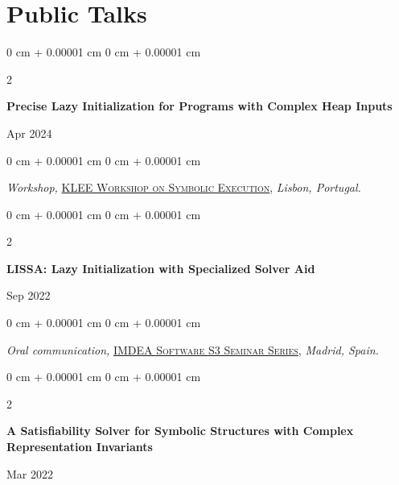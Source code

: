 \documentclass[10pt, letterpaper]{article}
\newenvironment{onecolentry}{
    \begin{adjustwidth}{
        0 cm + 0.00001 cm
    }{
        0 cm + 0.00001 cm
    }
}{
    \end{adjustwidth}
} %
\newenvironment{twocolentry}[2][]{
    \onecolentry
    \def\secondColumn{#2}
    \setcolumnwidth{\fill, 4.5 cm}
    \begin{paracol}{2}
}{
    \switchcolumn \raggedleft \secondColumn
    \end{paracol}
    \endonecolentry
} %
\begin{document}

\vspace{0.1 cm}

    \section{Public Talks}

    \vspace{0.1 cm}


    \begin{twocolentry}{
        Apr 2024
    }
        \textbf{Precise Lazy Initialization for Programs with Complex Heap Inputs}
    \end{twocolentry}

    \vspace{0.1 cm}
    \begin{onecolentry}
        \textit{Workshop,} \href{https://conf.researchr.org/details/icse-2024/klee-2024-papers/23/Precise-Lazy-Initialization-for-Programs-with-Complex-Heap-Inputs}{\textsc{KLEE Workshop on Symbolic Execution}}, \textit{Lisbon, Portugal.}
    \end{onecolentry}


    \vspace{0.2 cm}


    \begin{twocolentry}{
        Sep 2022
    }
        \textbf{LISSA: Lazy Initialization with Specialized Solver Aid}
    \end{twocolentry}

    \vspace{0.1 cm}
    \begin{onecolentry}
        \textit{Oral communication,}
        \href{https://software.imdea.org/es/events/software-seminars/2022/09-27/}{\textsc{IMDEA Software S3 Seminar Series}},
        \textit{Madrid, Spain.}
    \end{onecolentry}


    \vspace{0.2 cm}


    \begin{twocolentry}{
        Mar 2022
    }
        \textbf{A Satisfiability Solver for Symbolic Structures with Complex Representation Invariants}
    \end{twocolentry}
\end{document}
